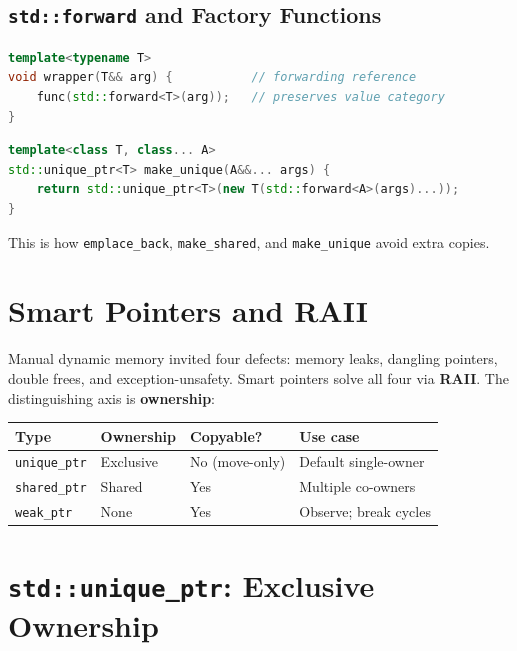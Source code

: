 \subsection{\texttt{std::forward} and Factory Functions}

\begin{lstlisting}[language=C++, caption={a perfectly-forwarding wrapper}]
template<typename T>
void wrapper(T&& arg) {           // forwarding reference
    func(std::forward<T>(arg));   // preserves value category
}
\end{lstlisting}

\begin{lstlisting}[language=C++, caption={variadic perfect-forwarding factory (this IS make\_unique)}]
template<class T, class... A>
std::unique_ptr<T> make_unique(A&&... args) {
    return std::unique_ptr<T>(new T(std::forward<A>(args)...));
}
\end{lstlisting}

This is how \texttt{emplace\_back}, \texttt{make\_shared}, and \texttt{make\_unique} avoid extra copies.

\section{Smart Pointers and RAII}

Manual dynamic memory invited four defects: memory leaks, dangling pointers, double frees, and exception-unsafety. Smart pointers solve all four via \textbf{RAII}. The distinguishing axis is \textbf{ownership}:

\begin{center}
\begin{tabular}{|l|l|l|l|}
\hline
\textbf{Type} & \textbf{Ownership} & \textbf{Copyable?} & \textbf{Use case} \\
\hline
\texttt{unique\_ptr} & Exclusive & No (move-only) & Default single-owner \\
\texttt{shared\_ptr} & Shared    & Yes & Multiple co-owners \\
\texttt{weak\_ptr}   & None      & Yes & Observe; break cycles \\
\hline
\end{tabular}
\end{center}

\section{\texttt{std::unique\_ptr}: Exclusive Ownership}

